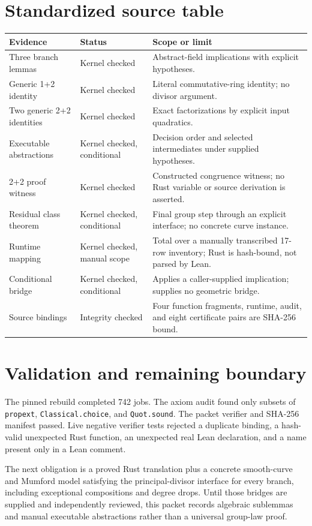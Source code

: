 \documentclass[10pt]{article}
\newcommand{\code}[1]{\texttt{#1}}
\begin{document}
\section*{Standardized source table}
\small
\begin{tabularx}{\textwidth}{@{}p{}p{}X@{}}
\toprule
Evidence & Status & Scope or limit \\
\midrule
Three branch lemmas & Kernel checked & Abstract-field implications with explicit hypotheses. \\
Generic 1+2 identity & Kernel checked & Literal commutative-ring identity; no divisor argument. \\
Two generic 2+2 identities & Kernel checked & Exact factorizations by explicit input quadratics. \\
Executable abstractions & Kernel checked, conditional & Decision order and selected intermediates under supplied hypotheses. \\
2+2 proof witness & Kernel checked & Constructed congruence witness; no Rust variable or source derivation is asserted. \\
Residual class theorem & Kernel checked, conditional & Final group step through an explicit interface; no concrete curve instance. \\
Runtime mapping & Kernel checked, manual scope & Total over a manually transcribed 17-row inventory; Rust is hash-bound, not parsed by Lean. \\
Conditional bridge & Kernel checked, conditional & Applies a caller-supplied implication; supplies no geometric bridge. \\
Source bindings & Integrity checked & Four function fragments, runtime, audit, and eight certificate pairs are SHA-256 bound. \\
\bottomrule
\end{tabularx}
\normalsize

\section*{Validation and remaining boundary}
The pinned rebuild completed 742 jobs. The axiom audit found only subsets of
\code{propext}, \code{Classical.choice}, and \code{Quot.sound}. The packet
verifier and SHA-256 manifest passed. Live negative verifier tests rejected a
duplicate binding, a hash-valid unexpected Rust function, an unexpected real
Lean declaration, and a name present only in a Lean comment.

The next obligation is a proved Rust translation plus a concrete smooth-curve
and Mumford model satisfying the principal-divisor interface for every branch,
including exceptional compositions and degree drops. Until those bridges are
supplied and independently reviewed, this packet records algebraic sublemmas
and manual executable abstractions rather than a universal group-law proof.
\end{document}
